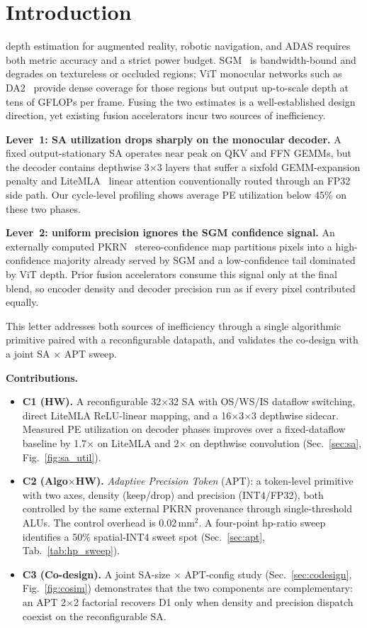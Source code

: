 \documentclass[lettersize,journal]{IEEEtran}
\begin{document}
\section{Introduction}
 depth estimation for augmented reality, robotic navigation, and ADAS requires both metric accuracy and a strict power budget. SGM~\cite{hirschmuller2008sgm} is bandwidth-bound and degrades on textureless or occluded regions; ViT monocular networks such as DA2~\cite{yang2024da2} provide dense coverage for those regions but output up-to-scale depth at tens of GFLOPs per frame. Fusing the two estimates is a well-established design direction, yet existing fusion accelerators incur two sources of inefficiency.

\textbf{Lever~1: SA utilization drops sharply on the monocular decoder.} A fixed output-stationary SA operates near peak on QKV and FFN GEMMs, but the decoder contains depthwise 3$\times$3 layers that suffer a sixfold GEMM-expansion penalty and LiteMLA~\cite{cai2023efficientvit} linear attention conventionally routed through an FP32 side path. Our cycle-level profiling shows average PE utilization below 45\% on these two phases.

\textbf{Lever~2: uniform precision ignores the SGM confidence signal.} An externally computed PKRN~\cite{poggi2016pkrn} stereo-confidence map partitions pixels into a high-confidence majority already served by SGM and a low-confidence tail dominated by ViT depth. Prior fusion accelerators consume this signal only at the final blend, so encoder density and decoder precision run as if every pixel contributed equally.

This letter addresses both sources of inefficiency through a single algorithmic primitive paired with a reconfigurable datapath, and validates the co-design with a joint SA $\times$ APT sweep.

\textbf{Contributions.}
\begin{itemize}
\item \textbf{C1 (HW).} A reconfigurable 32$\times$32 SA with OS/WS/IS dataflow switching, direct LiteMLA ReLU-linear mapping, and a 16$\times$3$\times$3 depthwise sidecar. Measured PE utilization on decoder phases improves over a fixed-dataflow baseline by 1.7$\times$ on LiteMLA and 2$\times$ on depthwise convolution (Sec.~\ref{sec:sa}, Fig.~\ref{fig:sa_util}).
\item \textbf{C2 (Algo$\times$HW).} \emph{Adaptive Precision Token} (APT): a token-level primitive with two axes, density (keep/drop) and precision (INT4/FP32), both controlled by the same external PKRN provenance through single-threshold ALUs. The control overhead is 0.02\,mm$^2$. A four-point hp-ratio sweep identifies a 50\% spatial-INT4 sweet spot (Sec.~\ref{sec:apt}, Tab.~\ref{tab:hp_sweep}).
\item \textbf{C3 (Co-design).} A joint SA-size $\times$ APT-config study (Sec.~\ref{sec:codesign}, Fig.~\ref{fig:cosim}) demonstrates that the two components are complementary: an APT 2$\times$2 factorial recovers D1 only when density and precision dispatch coexist on the reconfigurable SA.
\end{itemize}
\end{document}
